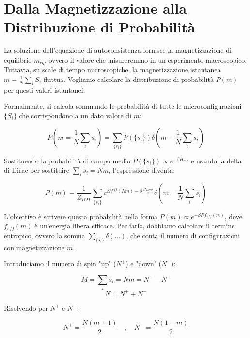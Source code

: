 \section{Dalla Magnetizzazione alla Distribuzione di Probabilità}
La soluzione dell'equazione di autoconsistenza fornisce la magnetizzazione di equilibrio $m_{eq}$, ovvero il valore che misureremmo in un esperimento macroscopico. Tuttavia, su scale di tempo microscopiche, la magnetizzazione istantanea $m = \frac{1}{N} \sum_i S_i$ fluttua.
Vogliamo calcolare la distribuzione di probabilità $P(m)$ per questi valori istantanei.

Formalmente, si calcola sommando le probabilità di tutte le microconfigurazioni $\{S_i\}$ che corrispondono a un dato valore di $m$:

\begin{equation} \label{eq:ch17_13}
P\left(m = \frac{1}{N}\sum_i s_i\right) = \sum_{\{s_i\}} P(\{s_i\}) \delta\left(m - \frac{1}{N}\sum_i s_i\right)
\end{equation}

Sostituendo la probabilità di campo medio $P(\{s_i\}) \propto e^{-\beta H_{mf}}$ e usando la delta di Dirac per sostituire $\sum_i s_i = Nm$, l'espressione diventa:

\begin{equation} \label{eq:ch17_14}
P(m) = \frac{1}{Z_{TOT}} \sum_{\{s_i\}} e^{\beta h^{eff} (Nm) - \beta \frac{J N z m^2}{2}} \delta\left(m - \frac{1}{N}\sum_i s_i\right)
\end{equation}

L'obiettivo è scrivere questa probabilità nella forma $P(m) \propto e^{-\beta N f_{eff}(m)}$, dove $f_{eff}(m)$ è un'energia libera efficace. Per farlo, dobbiamo calcolare il termine entropico, ovvero la somma $\sum_{\{s_i\}} \delta(\dots)$, che conta il numero di configurazioni con magnetizzazione $m$.

Introduciamo il numero di spin "up" ($N^+$) e "down" ($N^-$):

\begin{equation} \label{eq:ch17_15}
M = \sum_i s_i = Nm = N^+ - N^-
\end{equation}
\begin{equation} \label{eq:ch17_16}
N = N^+ + N^-
\end{equation}

Risolvendo per $N^+$ e $N^-$:

\begin{equation} \label{eq:ch17_17}
N^+ = \frac{N(m+1)}{2} \quad , \quad N^- = \frac{N(1-m)}{2}
\end{equation}

